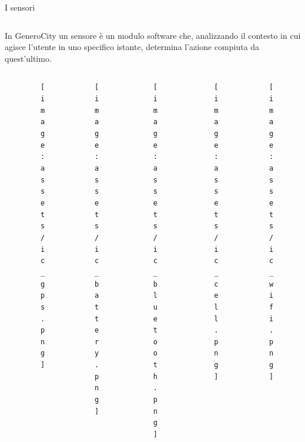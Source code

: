 \documentclass{beamer}
\begin{document}
\begin{frame}{I sensori}
\vspace{0.5cm}
\begin{columns}
    \begin{column}{0.95\textwidth}
        In GeneroCity un sensore è un modulo software che, analizzando il contesto in cui agisce l’utente in uno specifico istante, determina l’azione compiuta da quest’ultimo.
    \end{column}
\end{columns}
\vspace{0.5cm}

\begin{columns}
    \begin{column}{0.15\linewidth}
    \end{column}
    \begin{column}{0.15\linewidth}
        \begin{figure}
            \centering
            \texttt{[image: assets/ic\_gps.png]}
        \end{figure}
    \end{column}
    \begin{column}{0.15\linewidth}
        \begin{figure}
            \centering
            \texttt{[image: assets/ic\_battery.png]}
        \end{figure}
    \end{column}
    \begin{column}{0.15\linewidth}
        \begin{figure}
            \centering
            \texttt{[image: assets/ic\_bluetooth.png]}
        \end{figure}
    \end{column}
    \begin{column}{0.15\linewidth}
        \begin{figure}
            \centering
            \texttt{[image: assets/ic\_cell.png]}
        \end{figure}
    \end{column}
    \begin{column}{0.15\linewidth}
        \begin{figure}
            \centering
            \texttt{[image: assets/ic\_wifi.png]}
        \end{figure}
    \end{column}
    \begin{column}{0.15\linewidth}
    \end{column}

\end{columns}
\end{frame}
\end{document}
